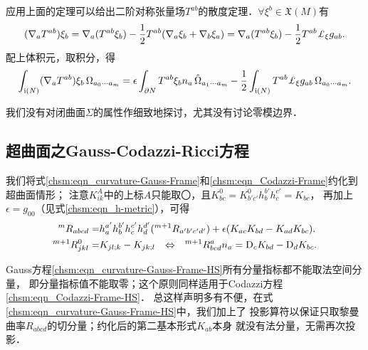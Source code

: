 应用上面的定理可以给出二阶对称张量场$T^{ab}$的散度定理．$\forall \xi^b \in \mathfrak{X}(M)$有
\begin{equation*}
      (\nabla_a T^{ab})\xi_b   %
    = \nabla_a(T^{ab} \xi_b ) - \frac{1}{2}T^{ab}( \nabla_a \xi_b +\nabla_b \xi_a )
    = \nabla_a(T^{ab} \xi_b ) - \frac{1}{2}T^{ab} \Lie_{\xi}g_{ab} .
\end{equation*}
配上体积元，取积分，得
\setlength{\mathindent}{0em}
\begin{equation}\label{chsm:eqn_Gauss-Divergence-Tab}
    \int_{{\rm i}(N)} (\nabla_a T^{ab}) \xi_b  \, {\Omega}_{a_0 \cdots a_{m} }
    =\epsilon \int_{\partial N} T^{ab}\xi_b n_a \, \hat{\Omega}_{a_1 \cdots a_{m} }
    - \frac{1}{2}\int_{{\rm i} (N)} T^{ab} \Lie_{\xi}g_{ab} \, {\Omega}_{a_0 \cdots a_{m} }  .
\end{equation}\setlength{\mathindent}{2em}

我们没有对闭曲面$\Sigma$的属性作细致地探讨，尤其没有讨论零模边界．





\subsection{超曲面之Gauss-Codazzi-Ricci方程}
我们将式\eqref{chsm:eqn_curvature-Gauss-Frame}和\eqref{chsm:eqn_Codazzi-Frame}约化到超曲面情形；
注意$K^A_{ik}$中的上标$A$只能取〇，且$K^0_{bc}=K^0_{b'c'} h_b^{b'} h_c^{c'} = K_{bc}$，
再加上$\epsilon=g_{00}$（见式\eqref{chsm:eqn_h-metric}），可得
\begin{align}
    {}^{m}{R}_{abcd} =& %
    h_a^{a'}h_b^{b'}h_c^{c'}h_d^{d'} ({}^{m+1}{R}_{a' b' c' d' })
     +\epsilon (K_{ac}K_{bd} - K_{ad} K_{bc} ).
    \label{chsm:eqn_curvature-Gauss-Frame-HS} \\
    {}^{m+1}{R}^0_{jkl} =& K_{jl;k} -K_{jk;l} {\quad \Leftrightarrow \quad  }
    {}^{m+1}{R}^a_{bcd}{n}_a = {\rm D}_c K_{bd}- {\rm D}_d K_{bc} .
    \label{chsm:eqn_Codazzi-Frame-HS}
\end{align}



Gauss方程\eqref{chsm:eqn_curvature-Gauss-Frame-HS}所有分量指标都不能取法空间分量，
即分量指标值不能取零；这个原则同样适用于Codazzi方程\eqref{chsm:eqn_Codazzi-Frame-HS}．
总这样声明多有不便，在式\eqref{chsm:eqn_curvature-Gauss-Frame-HS}中，我们加上了
投影算符以保证只取黎曼曲率${R}_{abcd}$的切分量；约化后的第二基本形式$K_{ab}$本身
就没有法分量，无需再次投影．

